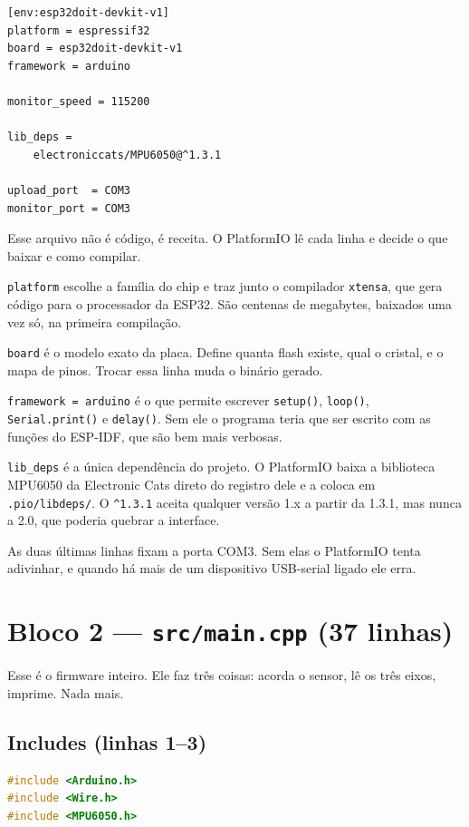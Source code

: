 \documentclass[11pt,a4paper]{article}
\begin{document}
\begin{lstlisting}[caption={platformio.ini}]
[env:esp32doit-devkit-v1]
platform = espressif32
board = esp32doit-devkit-v1
framework = arduino

monitor_speed = 115200

lib_deps =
    electroniccats/MPU6050@^1.3.1

upload_port  = COM3
monitor_port = COM3
\end{lstlisting}

Esse arquivo não é código, é receita. O PlatformIO lê cada linha e decide o
que baixar e como compilar.

\texttt{platform} escolhe a família do chip e traz junto o compilador
\texttt{xtensa}, que gera código para o processador da ESP32. São centenas de
megabytes, baixados uma vez só, na primeira compilação.

\texttt{board} é o modelo exato da placa. Define quanta flash existe, qual o
cristal, e o mapa de pinos. Trocar essa linha muda o binário gerado.

\texttt{framework = arduino} é o que permite escrever \texttt{setup()},
\texttt{loop()}, \texttt{Serial.print()} e \texttt{delay()}. Sem ele o
programa teria que ser escrito com as funções do ESP-IDF, que são bem mais
verbosas.

\texttt{lib\_deps} é a única dependência do projeto. O PlatformIO baixa a
biblioteca MPU6050 da Electronic Cats direto do registro dele e a coloca em
\texttt{.pio/libdeps/}. O \texttt{\^{}1.3.1} aceita qualquer versão 1.x a
partir da 1.3.1, mas nunca a 2.0, que poderia quebrar a interface.

As duas últimas linhas fixam a porta COM3. Sem elas o PlatformIO tenta
adivinhar, e quando há mais de um dispositivo USB-serial ligado ele erra.

\newpage
\section{Bloco 2 --- \texttt{src/main.cpp} (37 linhas)}

Esse é o firmware inteiro. Ele faz três coisas: acorda o sensor, lê os três
eixos, imprime. Nada mais.

\subsection{Includes (linhas 1--3)}

\begin{lstlisting}[language=C++,firstnumber=1]
#include <Arduino.h>
#include <Wire.h>
#include <MPU6050.h>
\end{lstlisting}
\end{document}
